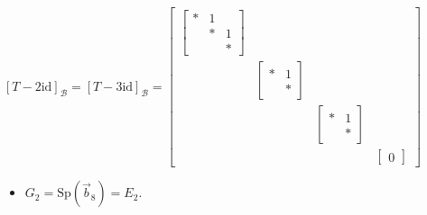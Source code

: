 \documentclass[11pt,fleqn]{book}
\begin{document}
\begin{itemize}
        $[T - 2\mathrm{id}]_\mathcal{B} = [T - 3\mathrm{id}]_\mathcal{B} = \begin{bmatrix} \begin{bmatrix} * &1 \\ &* &1 \\ & &* \end{bmatrix} \\ &\begin{bmatrix} * &1 \\ &* \end{bmatrix} \\ & &\begin{bmatrix} * &1 \\ &* \end{bmatrix} \\ & && \begin{bmatrix} 0 \end{bmatrix} \end{bmatrix}$
            
        \begin{itemize}
            \item $G_2 = \mathrm{Sp}(\vec{b}_8) = E_2$. 
        \end{itemize}
    \end{itemize}
    
\end{document}
